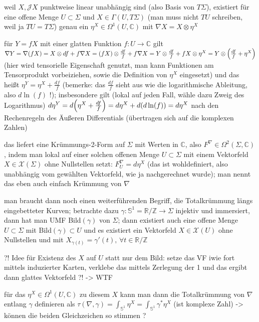 weil $X, \mathcal{J}X$ punktweise linear unabhängig sind (also Basis von $T\Sigma$), existiert für eine offene Menge $U \subset \Sigma$ und $X \in \Gamma(U, T\Sigma)$ (man muss nicht $TU$ schreiben, weil ja $TU = T\Sigma$) genau ein $\eta^X \in \Omega^1(U, \mathbb{C})$ mit $\nabla X = X \otimes \eta^X$

für  $Y = f X$ mit einer glatten Funktion $f: U \rightarrow \mathbb{C}$ gilt $\nabla Y = \nabla(f X) = X \otimes df + f \nabla X = \qty(f X) \otimes \frac{df}{f} + f \nabla X = Y \otimes \frac{df}{f} + f X \otimes \eta^X = Y \otimes \qty(\frac{df}{f} + \eta^X)$ (hier wird tensorielle Eigenschaft genutzt, man kann Funktionen am Tensorprodukt vorbeiziehen, sowie die Definition von $\eta^X$ eingesetzt) und das heißt $\eta^Y = \eta^X + \frac{df}{f}$ (bemerke: das $\frac{df}{f}$ sieht aus wie die logarithmische Ableitung, also $d\ln(f)$ !); insbesondere gilt (lokal auf jeden Fall, wähle dazu Zweig des Logarithmus) $d\eta^Y = d\qty(\eta^X + \frac{df}{f}) = d\eta^X + d\qty(d\ln(f)) = d\eta^X$ nach den Rechenregeln des Äußeren Differentials (übertragen sich auf die komplexen Zahlen)

das liefert eine Krümmungs-2-Form auf $\Sigma$ mit Werten in $\mathbb{C}$, also $F^\nabla \in \Omega^2(\Sigma, \mathbb{C})$, indem man lokal auf einer solchen offenen Menge $U \subset \Sigma$ mit einem Vektorfeld $X \in \mathcal{X}(\Sigma)$ ohne Nullstellen setzt: $F^\nabla_U = d\eta^X$ (das ist wohldefiniert, also unabhängig vom gewählten Vektorfeld, wie ja nachgerechnet wurde); man nennt das eben auch einfach Krümmung von $\nabla$


man braucht dann noch einen weiterführenden Begriff, die Totalkrümmung längs eingebetteter Kurven; betrachte dazu $\gamma: \mathbb{S}^1 = \mathbb{R}/ \mathbb{Z} \rightarrow \Sigma$ injektiv und immersiert, dann hat man UMF Bild$(\gamma)$ von $\Sigma$; dann existiert auch eine offene Menge $U \subset \Sigma$ mit Bild$(\gamma) \subset U$ und es existiert ein Vektorfeld $X \in \mathcal{X}(U)$ ohne Nullstellen und mit $X_{\gamma(t)} = \gamma'(t), \, \forall t \in \mathbb{R}/ \mathbb{Z}$

?! Idee für Existenz des $X$ auf $U$ statt nur dem Bild: setze das VF iwie fort mittels induzierter Karten, verklebe das mittels Zerlegung der 1 und das ergibt dann glattes Vektorfeld ?! -> WTF

für das $\eta^X \in \Omega^1(U, \mathbb{C})$ zu diesem $X$ kann man dann die Totalkrümmung von $\nabla$ entlang $\gamma$ definieren als $\tau(\nabla, \gamma) = \int_{\mathbb{S}^1} \eta^X = \int_{\mathbb{S}^1} \gamma^*\eta^X$ (ist komplexe Zahl) -> können die beiden Gleichzeichen so stimmen ?


